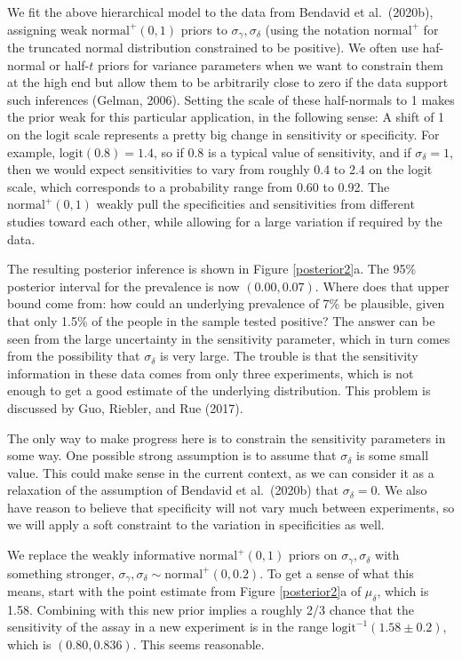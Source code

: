 \documentclass[11pt]{article}
\begin{document}
We  fit the above hierarchical model to the data from Bendavid et al.\ (2020b), assigning weak $\mbox{normal}^+(0,1)$ priors to $\sigma_{\gamma},\sigma_{\delta}$ (using the notation $\mbox{normal}^+$ for the truncated normal distribution constrained to be positive).  We often use haf-normal or half-$t$ priors for variance parameters when we want to constrain them at the high end but allow them to be arbitrarily close to zero if the data support such inferences (Gelman, 2006).  Setting the scale of these half-normals to 1 makes the prior weak for this particular application, in the following sense:  A shift of 1 on the logit scale represents a pretty big change in sensitivity or specificity.  For example, $\mbox{logit}(0.8)=1.4$, so if 0.8 is a typical value of sensitivity, and if $\sigma_{\delta}=1$, then we would expect sensitivities to vary from roughly 0.4 to 2.4 on the logit scale, which corresponds to a probability range from 0.60 to 0.92.  The $\mbox{normal}^+(0,1)$ weakly pull the specificities and sensitivities from different studies toward each other, while allowing for a large variation if required by the data.

The resulting posterior inference is shown in Figure \ref{posterior2}a.  The 95\% posterior interval for the prevalence is now $(0.00, 0.07)$.  Where does that upper bound come from:  how could an underlying prevalence of 7\% be plausible, given that only 1.5\% of the people in the sample tested positive?  The answer can be seen from the large uncertainty in the sensitivity parameter, which in turn comes from the possibility that $\sigma_{\delta}$ is very large.  The trouble is that the sensitivity information in these data comes from only three experiments, which is not enough to get a good estimate of the underlying distribution.  This problem is discussed by Guo, Riebler, and Rue (2017).

The only way to make progress here is to constrain the sensitivity parameters in some way.  One possible strong assumption is to assume that $\sigma_{\delta}$ is some small value.  This could make sense in the current context, as we can consider it as a relaxation of the assumption of Bendavid et al.\ (2020b) that $\sigma_{\delta} = 0$.  We also have reason to believe that specificity will not vary much between experiments, so we will apply a soft constraint to the variation in specificities as well.

We replace the weakly informative $\mbox{normal}^+(0, 1)$ priors on $\sigma_{\gamma},\sigma_{\delta}$ with something stronger,
$\sigma_{\gamma}, \sigma_{\delta}\sim\mbox{normal}^+(0, 0.2)$.  To get a sense of what this means, start with the point estimate from Figure \ref{posterior2}a of $\mu_{\delta}$, which is 1.58. Combining with this new prior implies a roughly 2/3 chance that the sensitivity of the assay in a new experiment is in the range $\mbox{logit}^{-1}(1.58 \pm 0.2)$, which is $(0.80, 0.836)$. This seems reasonable.
\end{document}
